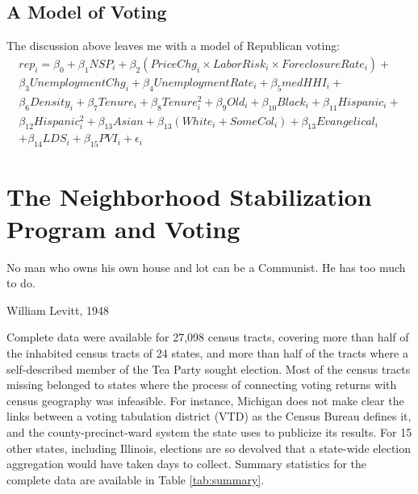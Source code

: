 \documentclass[12pt,oneside]{psthesis}
\begin{document}
\hypertarget{model}{%
\section{A Model of Voting}\label{model}}

The discussion above leaves me with a model of Republican voting:
\begin{multline}
rep_i = \beta_0 + \beta_1NSP_i + \beta_2(PriceChg_i \times LaborRisk_i \times ForeclosureRate_i) + \\ \beta_3UnemploymentChg_i + \beta_4UnemploymentRate_i + \beta_5medHHI_i + \\ \beta_6Density_i +
\beta_7Tenure_i + \beta_8Tenure^2_i + \beta_9Old_i + \beta_{10}Black_i + \beta_{11}Hispanic_i + \\ \beta_{12}Hispanic^2_i + \beta_{13}Asian + \beta_{13}(White_i + SomeCol_i) + \beta_{13}Evangelical_i \\ + \beta_{14}LDS_i + \beta_{15}PVI_i + \epsilon_i
\label{eq:model}
\end{multline}
\hypertarget{outcome}{%
\chapter{The Neighborhood Stabilization Program and Voting}\label{outcome}}

\epigraph{No man who owns his own house and lot can be a Communist. He has too much to do.}{William Levitt, 1948}

Complete data were available for 27,098 census tracts, covering more than half of the inhabited census tracts of 24 states, and more than half of the tracts where a self-described member of the Tea Party sought election.
Most of the census tracts missing belonged to states where the process of connecting voting returns with census geography was infeasible.
For instance, Michigan does not make clear the links between a voting tabulation district (VTD) as the Census Bureau defines it, and the county-precinct-ward system the state uses to publicize its results.
For 15 other states, including Illinois, elections are so devolved that a state-wide election aggregation would have taken days to collect.
Summary statistics for the complete data are available in Table \ref{tab:summary}.
\end{document}
